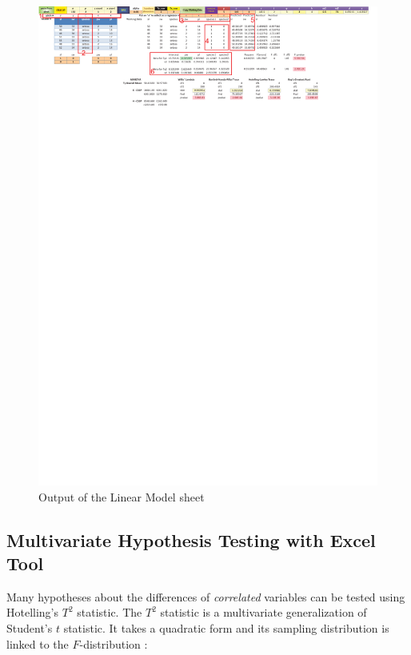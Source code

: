 \documentclass[article]{jss}
\numberwithin{equation}{subsection}
\begin{document}
        \begin{figure}[!tbh]
                \centering
                \includegraphics[width=\linewidth, keepaspectratio=true]{img/LMSheetOutput_markup}
                \vspace{-20pt}\centering{}\protect\caption{Output of the Linear Model sheet}\label{fig:LMSheetOutput_markup}
        \end{figure}
        
        \subsection[egOneSample]{Multivariate Hypothesis Testing with Excel Tool}
        
        Many hypotheses about the differences of \emph{correlated} variables can be tested using Hotelling's $T^2$ statistic. The $T^2$ statistic is a multivariate generalization of Student's $t$ statistic. It takes a quadratic form and its sampling distribution is linked to the $F$-distribution \citep{hotelling1931Tsq}:
        
\end{document}
